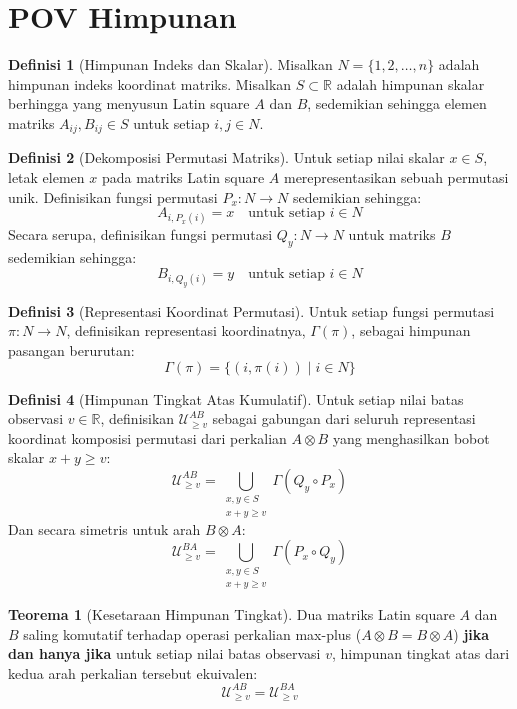 \documentclass{article}
\theoremstyle{definition}
\newtheorem{definisi}{Definisi}
\newtheorem{teorema}{Teorema}
\begin{document}
\section*{POV Himpunan}
\begin{definisi}[Himpunan Indeks dan Skalar]
  Misalkan $N = \{1, 2, \dots, n\}$ adalah himpunan indeks koordinat matriks. Misalkan $S \subset \mathbb{R}$ adalah himpunan skalar berhingga yang menyusun Latin square $A$ dan $B$, sedemikian sehingga elemen matriks $A_{ij}, B_{ij} \in S$ untuk setiap $i, j \in N$.
\end{definisi}

\begin{definisi}[Dekomposisi Permutasi Matriks]
  Untuk setiap nilai skalar $x \in S$, letak elemen $x$ pada matriks Latin square $A$ merepresentasikan sebuah permutasi unik. Definisikan fungsi permutasi $P_x : N \to N$ sedemikian sehingga:
  $$A_{i, P_x(i)} = x \quad \text{untuk setiap } i \in N$$
  Secara serupa, definisikan fungsi permutasi $Q_y : N \to N$ untuk matriks $B$ sedemikian sehingga:
  $$B_{i, Q_y(i)} = y \quad \text{untuk setiap } i \in N$$
\end{definisi}

\begin{definisi}[Representasi Koordinat Permutasi]
  Untuk setiap fungsi permutasi $\pi : N \to N$, definisikan representasi koordinatnya, $\Gamma(\pi)$, sebagai himpunan pasangan berurutan:
  $$\Gamma(\pi) = \{(i, \pi(i)) \mid i \in N\}$$
\end{definisi}

\begin{definisi}[Himpunan Tingkat Atas Kumulatif]
  Untuk setiap nilai batas observasi $v \in \mathbb{R}$, definisikan $\mathcal{U}_{\ge v}^{AB}$ sebagai gabungan dari seluruh representasi koordinat komposisi permutasi dari perkalian $A \otimes B$ yang menghasilkan bobot skalar $x + y \ge v$:
  $$\mathcal{U}_{\ge v}^{AB} = \bigcup_{\substack{x, y \in S \\ x+y \ge v}} \Gamma(Q_y \circ P_x)$$
  Dan secara simetris untuk arah $B \otimes A$:
  $$\mathcal{U}_{\ge v}^{BA} = \bigcup_{\substack{x, y \in S \\ x+y \ge v}} \Gamma(P_x \circ Q_y)$$
\end{definisi}

\begin{teorema}[Kesetaraan Himpunan Tingkat]
  Dua matriks Latin square $A$ dan $B$ saling komutatif terhadap operasi perkalian max-plus ($A \otimes B = B \otimes A$) \textbf{jika dan hanya jika} untuk setiap nilai batas observasi $v$, himpunan tingkat atas dari kedua arah perkalian tersebut ekuivalen:
  $$\mathcal{U}_{\ge v}^{AB} = \mathcal{U}_{\ge v}^{BA}$$
\end{teorema}
\end{document}
